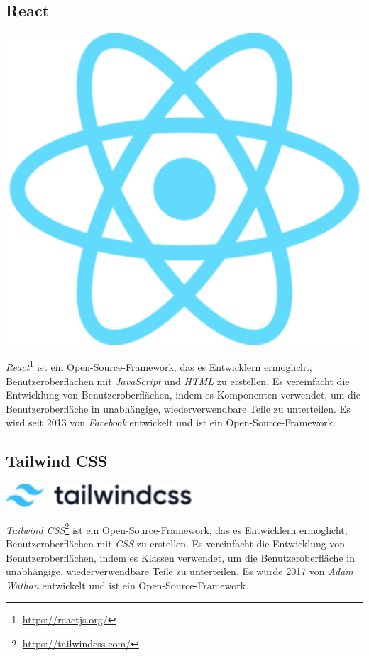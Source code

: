 \newpage

\subsection{React}\label{subsec:react}

\includegraphics[scale=0.1]{assets/react-logo}

\emph{React}\footnote{\url{https://reactjs.org/}} ist ein Open-Source-Framework, das es Entwicklern ermöglicht, Benutzeroberflächen mit \emph{JavaScript} und \emph{HTML} zu erstellen.
Es vereinfacht die Entwicklung von Benutzeroberflächen, indem es Komponenten verwendet, um die Benutzeroberfläche in unabhängige, wiederverwendbare Teile zu unterteilen.
Es wird seit 2013 von \emph{Facebook} entwickelt und ist ein Open-Source-Framework.

\subsection{Tailwind CSS}\label{subsec:tailwind-css}

\includegraphics[scale=0.5]{assets/tailwindcss-logotype}

\emph{Tailwind CSS}\footnote{\url{https://tailwindcss.com/}} ist ein Open-Source-Framework, das es Entwicklern ermöglicht, Benutzeroberflächen mit \emph{CSS} zu erstellen.
Es vereinfacht die Entwicklung von Benutzeroberflächen, indem es Klassen verwendet, um die Benutzeroberfläche in unabhängige, wiederverwendbare Teile zu unterteilen.
Es wurde 2017 von \emph{Adam Wathan} entwickelt und ist ein Open-Source-Framework.
